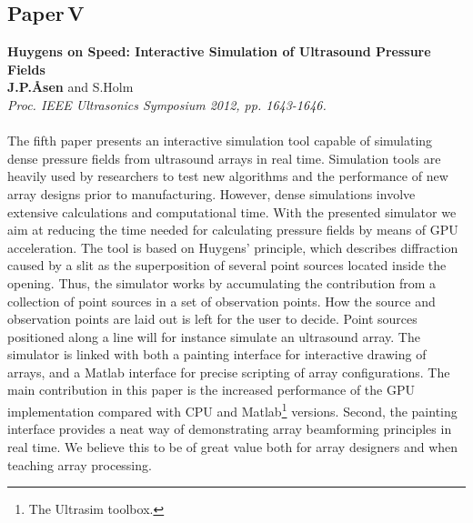 \subsection{Paper\,V}
\textbf{Huygens on Speed: Interactive Simulation of Ultrasound Pressure Fields}\\
\textbf{J.\:P.\:\AA{}sen} and S.\:Holm\\
{\it Proc. IEEE Ultrasonics Symposium 2012, pp. 1643-1646.}\\\\
The fifth paper presents an interactive simulation tool capable of simulating dense pressure fields from ultrasound arrays in real time. Simulation tools are heavily used by researchers to test new algorithms and the performance of new array designs prior to manufacturing. However, dense simulations involve extensive calculations and computational time. With the presented simulator we aim at reducing the time needed for calculating pressure fields by means of GPU acceleration. The tool is based on Huygens' principle, which describes diffraction caused by a slit as the superposition of several point sources located inside the opening. Thus, the simulator works by accumulating the contribution from a collection of point sources in a set of observation points. How the source and observation points are laid out is left for the user to decide. Point sources positioned along a line will for instance simulate an ultrasound array. The simulator is linked with both a painting interface for interactive drawing of arrays, and a Matlab interface for precise scripting of array configurations. The main contribution in this paper is the increased performance of the GPU implementation compared with CPU and Matlab\footnote{The Ultrasim toolbox.} versions. Second, the painting interface provides a neat way of demonstrating array beamforming principles in real time. We believe this to be of great value both for array designers and when teaching array processing.

